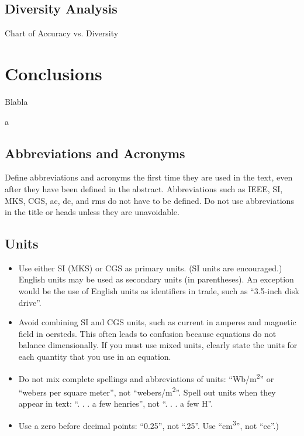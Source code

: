 \documentclass[conference]{IEEEtran}
\begin{document}
\subsection{Diversity Analysis}

Chart of Accuracy vs. Diversity

\section{Conclusions}
Blabla 

\newpage
a
\newpage














\subsection{Abbreviations and Acronyms}\label{AA}
Define abbreviations and acronyms the first time they are used in the text, 
even after they have been defined in the abstract. Abbreviations such as 
IEEE, SI, MKS, CGS, ac, dc, and rms do not have to be defined. Do not use 
abbreviations in the title or heads unless they are unavoidable.

\subsection{Units}
\begin{itemize}
\item Use either SI (MKS) or CGS as primary units. (SI units are encouraged.) English units may be used as secondary units (in parentheses). An exception would be the use of English units as identifiers in trade, such as ``3.5-inch disk drive''.
\item Avoid combining SI and CGS units, such as current in amperes and magnetic field in oersteds. This often leads to confusion because equations do not balance dimensionally. If you must use mixed units, clearly state the units for each quantity that you use in an equation.
\item Do not mix complete spellings and abbreviations of units: ``Wb/m\textsuperscript{2}'' or ``webers per square meter'', not ``webers/m\textsuperscript{2}''. Spell out units when they appear in text: ``. . . a few henries'', not ``. . . a few H''.
\item Use a zero before decimal points: ``0.25'', not ``.25''. Use ``cm\textsuperscript{3}'', not ``cc''.)
\end{itemize}
\end{document}
